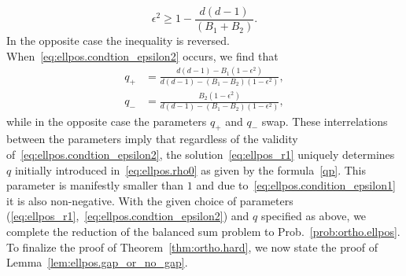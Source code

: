\begin{equation}
  \epsilon^{2}\geq1-\frac{d\left(d-1\right)}{\left(B_{1}+B_{2}\right)}.
  \label{eq:ellpos.condtion_epsilon2}
\end{equation}
In the opposite case the inequality is reversed.
When~\eqref{eq:ellpos.condtion_epsilon2} occurs, we find that
\begin{align}
  q_{+} &= \frac{d\left(d-1\right)-B_{1}\left(1-\epsilon^{2}\right)}{d\left(d-1\right)-\left(B_{1}-B_{2}\right)\left(1-\epsilon^{2}\right)}\label{qp},\\
  q_{-} &=\frac{B_{2}\left(1-\epsilon^{2}\right)}{d\left(d-1\right)-\left(B_{1}-B_{2}\right)\left(1-\epsilon^{2}\right)},
\end{align}
while in the opposite case the parameters $q_{+}$ and $q_{-}$ swap.
These interrelations between the parameters imply that regardless of the validity of~\eqref{eq:ellpos.condtion_epsilon2}, the solution~\eqref{eq:ellpos_r1} uniquely determines  $q$ initially introduced in~\eqref{eq:ellpos.rho0} as given by the formula~\eqref{qp}. This parameter is manifestly smaller than $1$ and due to~\eqref{eq:ellpos.condition_epsilon1} it is also non-negative.
With the given choice of parameters (\ref{eq:ellpos_r1},~\ref{eq:ellpos.condtion_epsilon2}) and $q$ specified as above, we complete the reduction of the balanced sum problem to Prob.~\ref{prob:ortho.ellpos}.
To finalize the proof of Theorem~\ref{thm:ortho.hard}, we now state the proof of Lemma~\ref{lem:ellpos.gap_or_no_gap}.
